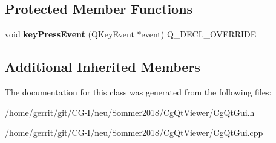 \subsection*{Protected Member Functions}
\begin{DoxyCompactItemize}
\item 
\mbox{\label{class_cg_qt_gui_aaebb7ea78d8aea26128db5d378b72ade}} 
void {\bfseries key\+Press\+Event} (Q\+Key\+Event $\ast$event) Q\+\_\+\+D\+E\+C\+L\+\_\+\+O\+V\+E\+R\+R\+I\+DE
\end{DoxyCompactItemize}
\subsection*{Additional Inherited Members}


The documentation for this class was generated from the following files\+:\begin{DoxyCompactItemize}
\item 
/home/gerrit/git/\+C\+G-\/\+I/neu/\+Sommer2018/\+Cg\+Qt\+Viewer/Cg\+Qt\+Gui.\+h\item 
/home/gerrit/git/\+C\+G-\/\+I/neu/\+Sommer2018/\+Cg\+Qt\+Viewer/Cg\+Qt\+Gui.\+cpp\end{DoxyCompactItemize}

